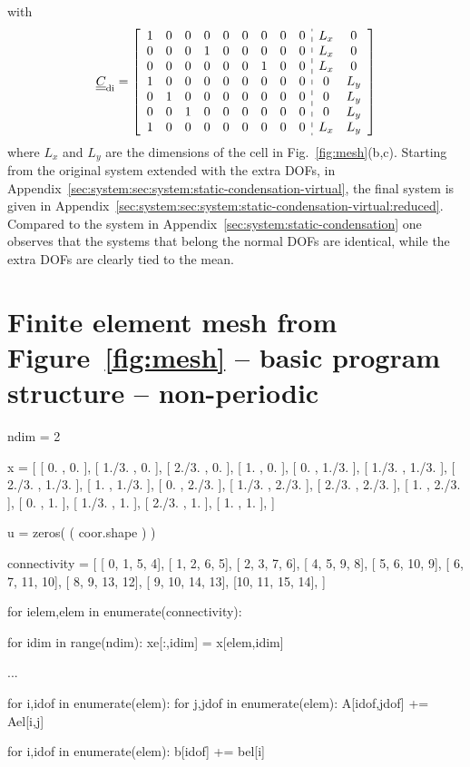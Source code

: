 \documentclass[times,namecite]{goose-article}
\begin{document}
with
\begin{equation}
  \underline{\underline{C}}_\mathrm{di} =
  \left[
  \begin{array}{ccccccccc:cc}
    1 & 0 & 0 & 0 & 0 & 0 & 0 & 0 & 0 & L_x &   0 \\
    0 & 0 & 0 & 1 & 0 & 0 & 0 & 0 & 0 & L_x &   0 \\
    0 & 0 & 0 & 0 & 0 & 0 & 1 & 0 & 0 & L_x &   0 \\
    1 & 0 & 0 & 0 & 0 & 0 & 0 & 0 & 0 &   0 & L_y \\
    0 & 1 & 0 & 0 & 0 & 0 & 0 & 0 & 0 &   0 & L_y \\
    0 & 0 & 1 & 0 & 0 & 0 & 0 & 0 & 0 &   0 & L_y \\
    1 & 0 & 0 & 0 & 0 & 0 & 0 & 0 & 0 & L_x & L_y \\
  \end{array}
  \right]
\end{equation}
where $L_x$ and $L_y$ are the dimensions of the cell in Fig.~\ref{fig:mesh}(b,c). Starting from the original system extended with the extra DOFs, in Appendix~\ref{sec:system:sec:system:static-condensation-virtual}, the final system is given in Appendix~\ref{sec:system:sec:system:static-condensation-virtual:reduced}. Compared to the system in Appendix~\ref{sec:system:static-condensation} one observes that the systems that belong the normal DOFs are identical, while the extra DOFs are clearly tied to the mean.

\appendix

\newpage
\section{Finite element mesh from Figure~\ref{fig:mesh} -- basic program structure -- non-periodic}
\label{sec:code}

\begin{python}
ndim = 2

x = [
  [ 0.    , 0.    ],
  [ 1./3. , 0.    ],
  [ 2./3. , 0.    ],
  [ 1.    , 0.    ],
  [ 0.    , 1./3. ],
  [ 1./3. , 1./3. ],
  [ 2./3. , 1./3. ],
  [ 1.    , 1./3. ],
  [ 0.    , 2./3. ],
  [ 1./3. , 2./3. ],
  [ 2./3. , 2./3. ],
  [ 1.    , 2./3. ],
  [ 0.    , 1.    ],
  [ 1./3. , 1.    ],
  [ 2./3. , 1.    ],
  [ 1.    , 1.    ],
]

u = zeros( ( coor.shape ) )

connectivity = [
  [ 0,  1,  5,  4],
  [ 1,  2,  6,  5],
  [ 2,  3,  7,  6],
  [ 4,  5,  9,  8],
  [ 5,  6, 10,  9],
  [ 6,  7, 11, 10],
  [ 8,  9, 13, 12],
  [ 9, 10, 14, 13],
  [10, 11, 15, 14],
]

for ielem,elem in enumerate(connectivity):

  for idim in range(ndim):
    xe[:,idim] = x[elem,idim]

  ...

  for i,idof in enumerate(elem):
    for j,jdof in enumerate(elem):
      A[idof,jdof] += Ael[i,j]

  for i,idof in enumerate(elem):
    b[idof] += bel[i]
\end{python}
\end{document}
